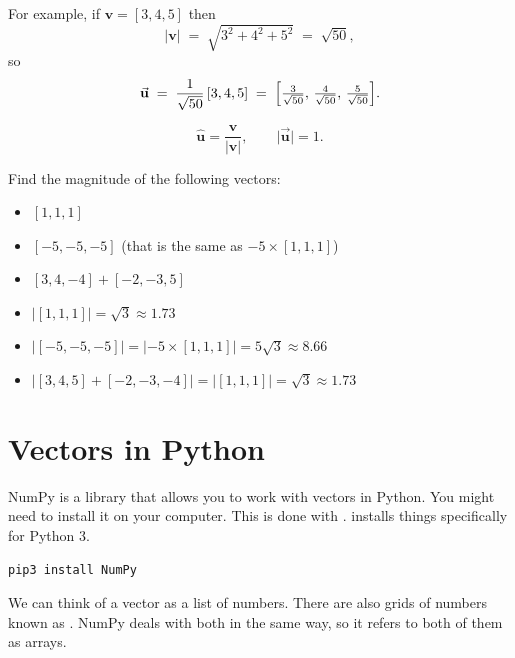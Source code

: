 For example, if \(\mathbf v=[3,4,5]\) then
\[
\lvert\mathbf v\rvert
   \;=\;\sqrt{3^{2}+4^{2}+5^{2}}
   \;=\;\sqrt{50},
\]
so
\[
\vec{\mathbf u}
   \;=\;\frac{1}{\sqrt{50}}\,[3,4,5]
   \;=\;\Bigl[\tfrac{3}{\sqrt{50}},\,
              \tfrac{4}{\sqrt{50}},\,
              \tfrac{5}{\sqrt{50}}\Bigr].
\]

\[
\boxed{\displaystyle
\widehat{\mathbf u}=\frac{\mathbf v}{\lvert\mathbf v\rvert}},\qquad
\lvert\vec{\mathbf u}\rvert=1.
\]



\begin{Exercise}[title={Magnitude of a Vector}, label=vector_mag]
    Find the magnitude of the following vectors:
    \begin{itemize}
        \item $[1, 1, 1]$
        \item $[-5, -5, -5]$ (that is the same as $-5 \times [1, 1, 1]$)
        \item $[3, 4, -4] + [-2, -3, 5]$
    \end{itemize}
    \end{Exercise}
    \begin{Answer}[ref=vector_mag]
        \begin{itemize}
            \item $|[1, 1, 1]| = \sqrt{3} \approx 1.73 $
            \item $|[-5, -5, -5]| = |-5 \times [1,1,1]| = 5 \sqrt{3} \approx 
            8.66$
            \item $|[3, 4, 5] + [-2, -3, -4]| = | [1,1,1] | = \sqrt{3} 
            \approx 1.73$ 
        \end{itemize}
    \end{Answer}

\section{Vectors in Python}

NumPy is a library that allows you to work with vectors in Python. You might 
need to install it on your computer. This is done with . 
 installs things specifically for Python 3.

\begin{Verbatim}
pip3 install NumPy
\end{Verbatim}

We can think of a vector as a list of numbers.  
There are also grids of numbers known as . NumPy deals with 
both in the same way, so it refers to both of them as arrays.

